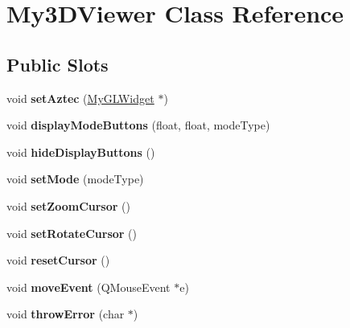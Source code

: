 \hypertarget{class_my3_d_viewer}{\section{My3\-D\-Viewer Class Reference}
\label{class_my3_d_viewer}
}
\subsection*{Public Slots}
\begin{DoxyCompactItemize}
\item 
\hypertarget{class_my3_d_viewer_ac8426c8bd3097a71f76c74f0f57427f0}{void {\bfseries set\-Aztec} (\hyperlink{class_my_g_l_widget}{My\-G\-L\-Widget} $\ast$)}\label{class_my3_d_viewer_ac8426c8bd3097a71f76c74f0f57427f0}

\item 
\hypertarget{class_my3_d_viewer_adf4b90e3b9784d9735b85e59d4af5a17}{void {\bfseries display\-Mode\-Buttons} (float, float, mode\-Type)}\label{class_my3_d_viewer_adf4b90e3b9784d9735b85e59d4af5a17}

\item 
\hypertarget{class_my3_d_viewer_a69ebec054e7d47ac8f5d957728a1d036}{void {\bfseries hide\-Display\-Buttons} ()}\label{class_my3_d_viewer_a69ebec054e7d47ac8f5d957728a1d036}

\item 
\hypertarget{class_my3_d_viewer_a2acb05d78622251cfdde8c35392a447f}{void {\bfseries set\-Mode} (mode\-Type)}\label{class_my3_d_viewer_a2acb05d78622251cfdde8c35392a447f}

\item 
\hypertarget{class_my3_d_viewer_aa7af12ffea72db0261eb64bb92729a6f}{void {\bfseries set\-Zoom\-Cursor} ()}\label{class_my3_d_viewer_aa7af12ffea72db0261eb64bb92729a6f}

\item 
\hypertarget{class_my3_d_viewer_a2bbadf19d8aa29f0f82e1b7fc7edfbd0}{void {\bfseries set\-Rotate\-Cursor} ()}\label{class_my3_d_viewer_a2bbadf19d8aa29f0f82e1b7fc7edfbd0}

\item 
\hypertarget{class_my3_d_viewer_a7b8317264774c3a94d890756fff1fa89}{void {\bfseries reset\-Cursor} ()}\label{class_my3_d_viewer_a7b8317264774c3a94d890756fff1fa89}

\item 
\hypertarget{class_my3_d_viewer_a1deeca102b855f291b3a3ea3321b32e4}{void {\bfseries move\-Event} (Q\-Mouse\-Event $\ast$e)}\label{class_my3_d_viewer_a1deeca102b855f291b3a3ea3321b32e4}

\item 
\hypertarget{class_my3_d_viewer_acf14f2b7a450bcfe22f579d7a7c22995}{void {\bfseries throw\-Error} (char $\ast$)}\label{class_my3_d_viewer_acf14f2b7a450bcfe22f579d7a7c22995}

\end{DoxyCompactItemize}
